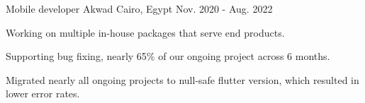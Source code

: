 \begin{cventries}
  \cventry
    {Mobile developer} %
    {Akwad} %
    {Cairo, Egypt} %
    {Nov. 2020 - Aug. 2022} %
    {
      \begin{cvitems} %
        \item {Working on multiple in-house packages that serve end products.}
        \item {Supporting bug fixing, nearly 65\% of our ongoing project across 6 months.}
        \item {Migrated nearly all ongoing projects to null-safe flutter version, which resulted in lower error rates.}
      \end{cvitems}
    }

\end{cventries}
